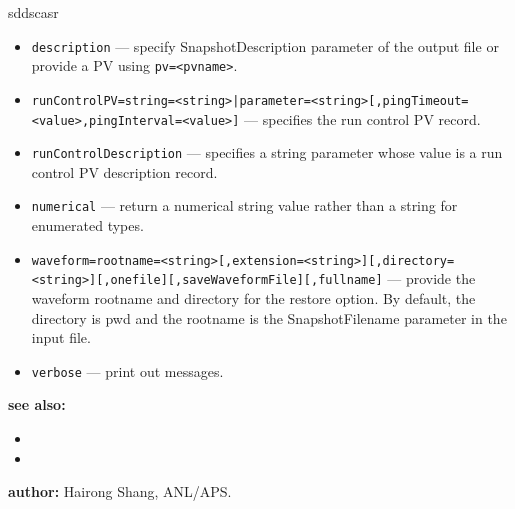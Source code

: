 \begin{sddsprog}{sddscasr}
\begin{itemize}
  \item {\tt description} --- specify SnapshotDescription parameter of the output file or provide a PV using {\tt pv=<pvname>}.
  \item {\tt runControlPV=string=<string>|parameter=<string>[,pingTimeout=<value>,pingInterval=<value>]} --- specifies the run control PV record.
  \item {\tt runControlDescription} --- specifies a string parameter whose value is a run control PV description record.
  \item {\tt numerical} --- return a numerical string value rather than a string for enumerated types.
  \item {\tt waveform=rootname=<string>[,extension=<string>][,directory=<string>][,onefile][,saveWaveformFile][,fullname]} --- provide the waveform rootname and directory for the restore option. By default, the directory is pwd and the rootname is the SnapshotFilename parameter in the input file.
  \item {\tt verbose} --- print out messages.
\end{itemize}

\item \textbf{see also:}
\begin{itemize}
  \item {}
  \item {}
\end{itemize}
\item \textbf{author:} Hairong Shang, ANL/APS.
\end{sddsprog}
